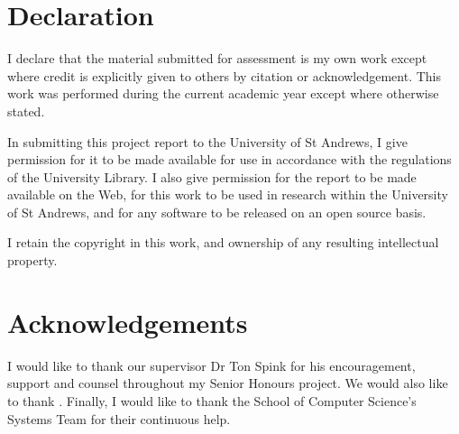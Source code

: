 \chapter*{Declaration}
I declare that the material submitted for assessment is my own work except
where credit is explicitly given to others by citation or acknowledgement. This
work was performed during the current academic year except where otherwise
stated.

In submitting this project report to the University of St Andrews, I give
permission for it to be made available for use in accordance with the
regulations of the University Library. I also give permission for the report to
be made available on the Web, for this work to be used in research within the
University of St Andrews, and for any software to be released on an open source
basis.

I retain the copyright in this work, and ownership of any resulting intellectual property.

{\let\clearpage\relax \chapter*{Acknowledgements}}
I would like to thank our supervisor Dr Ton Spink for his
encouragement, support and counsel throughout my Senior Honours project. We
would also like to thank . Finally, I would like to thank the School
of Computer Science's Systems Team for their continuous help.

